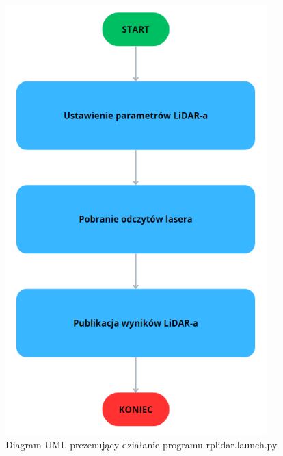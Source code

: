 \documentclass[a4paper,twoside,12pt]{book}
\begin{document}
\begin{figure}[!hb]
	\centering
	\includegraphics[width=0.9\textwidth]{images/uml-lidar.png}
	\caption{Diagram UML prezenujący działanie programu rplidar.launch.py}
	\label{fig:diagram-lidar}
\end{figure}
\end{document}
